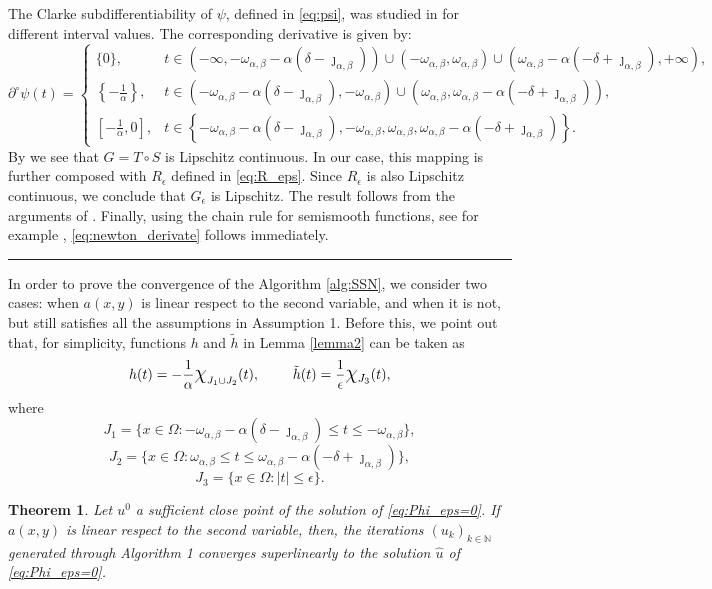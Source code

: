 \documentclass[11pt,a4paper]{amsart}
\newcommand{\kw}{\rule{2mm}{2mm}}
\renewcommand{\l}{\left}
\renewcommand{\r}{\right}
\newcommand{\om}{\Omega}
\renewenvironment{proof}{{Proof.}}{\hfill\kw}
\newtheorem{theorem}{{Theorem}}
\begin{document}
\begin{proof}
The Clarke subdifferentiability of $\psi$, defined in \eqref{eq:psi}, was studied in \cite{CasasMateos2024} for different interval values. The corresponding derivative is given by:
    \[
    \partial^{\circ}\psi(t)=\begin{cases}
        \{0\}, & t\in (-\infty, -\omega_{\alpha,\beta}-\alpha(\delta-\jmath_{\alpha,\beta}))\cup (-\omega_{\alpha,\beta}, \omega_{\alpha,\beta})\cup (\omega_{\alpha,\beta}-\alpha(-\delta+\jmath_{\alpha,\beta}),+\infty),\\
        \l\{-\frac{1}{\alpha}\r\}, & t \in (-\omega_{\alpha,\beta}-\alpha(\delta-\jmath_{\alpha,\beta}),-\omega_{\alpha,\beta})\cup (\omega_{\alpha,\beta}, \omega_{\alpha,\beta}-\alpha(-\delta+\jmath_{\alpha,\beta})),\\
        \l[-\frac{1}{\alpha},0\r], & t\in \l\{-\omega_{\alpha,\beta}-\alpha(\delta-\jmath_{\alpha,\beta}), -\omega_{\alpha,\beta}, \omega_{\alpha,\beta}, \omega_{\alpha,\beta}-\alpha(-\delta+\jmath_{\alpha,\beta})\r\}.
    \end{cases}
    \]
    By \cite[Lemma 2.4]{CasasMateos2024} we see that $G=T\circ S$ is Lipschitz continuous. In our case, this mapping is further composed with $R_\epsilon$ defined in \eqref{eq:R_eps}. Since $R_{\epsilon}$ is also Lipschitz continuous, we conclude that $G_{\epsilon}$ is Lipschitz. The result follows from the arguments of \cite[Lemma 3.3]{CasasMateos2024}. Finally, using the chain rule for semismooth functions, see for example \cite[Theorem 14.4]{valk}, \eqref{eq:newton_derivate} follows immediately.
\end{proof}

In order to prove the convergence of the Algorithm \ref{alg:SSN}, we consider two cases: when $a(x,y)$ is linear respect to the second variable, and when it is not, but still satisfies all the assumptions in Assumption 1. Before this, we point out that, for simplicity, functions $h$ and $\tilde{h}$ in Lemma \ref{lemma2} can be taken as
\[
h(t)=-\frac{1}{\alpha}\large{\mathlarger{\chi}}_{J_1\cup J_2}(t), \qquad \tilde{h}(t)=\frac{1}{\epsilon}\mathlarger{\chi}_{J_3}(t),
\]
where
\[
J_1 = \{x\in \om: -\omega_{\alpha,\beta}-\alpha(\delta-\jmath_{\alpha,\beta})\le t \le -\omega_{\alpha,\beta}\},
\]
\[
J_2 = \{x\in \om: \omega_{\alpha,\beta}\le t\le  \omega_{\alpha,\beta}-\alpha(-\delta+\jmath_{\alpha,\beta})\},
\]
\[
J_3 = \{x\in \om: |t|\le \epsilon\}.
\]
\begin{theorem}
    Let $u^0$ a sufficient close point of the solution of \eqref{eq:Phi_eps=0}. If $a(x,y)$ is linear respect to the second variable, then, the iterations $(u_k)_{k\in\mathbb{N}}$ generated through Algorithm 1 converges superlinearly to the solution $\hat{u}$ of \eqref{eq:Phi_eps=0}. 
\end{theorem}
\end{document}
